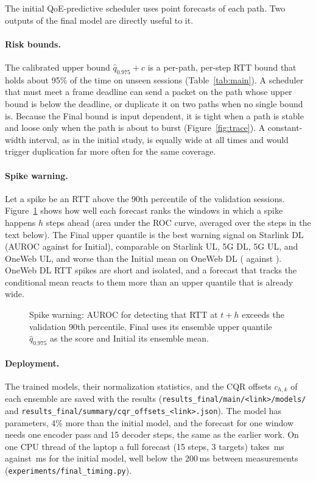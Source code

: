 The initial QoE-predictive scheduler uses point forecasts of each path. Two outputs of the final model are directly useful to it.

\paragraph{Risk bounds.} The calibrated upper bound $\hat{q}_{0.975}+c$ is a per-path, per-step RTT bound that holds about 95\% of the time on unseen sessions (Table~\ref{tab:main}). A scheduler that must meet a frame deadline can send a packet on the path whose upper bound is below the deadline, or duplicate it on two paths when no single bound is. Because the Final bound is input dependent, it is tight when a path is stable and loose only when the path is about to burst (Figure~\ref{fig:trace}). A constant-width interval, as in the initial study, is equally wide at all times and would trigger duplication far more often for the same coverage.

\paragraph{Spike warning.} Let a spike be an RTT above the 90th percentile of the validation sessions. Figure~\ref{fig:spike} shows how well each forecast ranks the windows in which a spike happens $h$ steps ahead (area under the ROC curve, averaged over the steps in the text below). The Final upper quantile is the best warning signal on Starlink DL (AUROC \AUCFRSLDL{} against \AUCPrevSLDL{} for Initial), comparable on Starlink UL, 5G DL, 5G UL, and OneWeb UL, and worse than the Initial mean on OneWeb DL (\AUCFROWDL{} against \AUCPrevOWDL). OneWeb DL RTT spikes are short and isolated, and a forecast that tracks the conditional mean reacts to them more than an upper quantile that is already wide.

\begin{figure}[t]
  \centering
  \resizebox{\linewidth}{!}{}
  \caption{Spike warning: AUROC for detecting that RTT at $t+h$ exceeds the validation 90th percentile. Final uses its ensemble upper quantile $\hat{q}_{0.975}$ as the score and Initial its ensemble mean.}
  \label{fig:spike}
\end{figure}

\paragraph{Deployment.} The trained models, their normalization statistics, and the CQR offsets $c_{h,k}$ of each ensemble are saved with the results (\texttt{results\_\allowbreak{}final/\allowbreak{}main/\allowbreak{}<link>/\allowbreak{}models/\allowbreak{}} and \texttt{results\_\allowbreak{}final/\allowbreak{}summary/\allowbreak{}cqr\_\allowbreak{}offsets\_\allowbreak{}<link>.json}). The model has \ParamsDist{} parameters, 4\% more than the initial model, and the forecast for one window needs one encoder pass and 15 decoder steps, the same as the earlier work. On one CPU thread of the laptop a full forecast (15 steps, 3 targets) takes \TimeDSCPU\,ms against \TimeSSCPU\,ms for the initial model, well below the 200\,ms between measurements (\texttt{experiments/\allowbreak{}final\_\allowbreak{}timing.py}).
